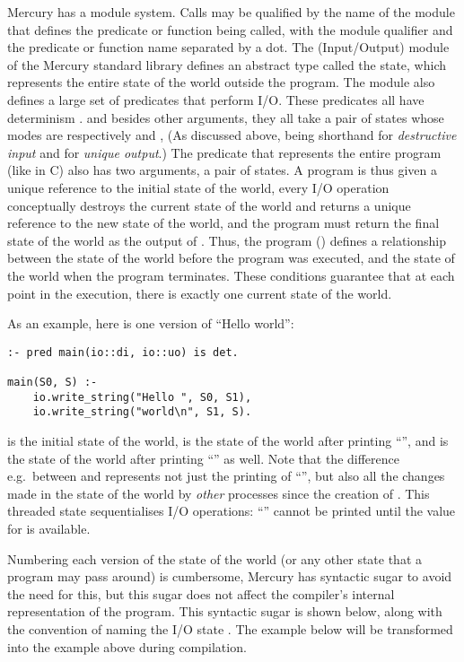 Mercury has a module system.
Calls may be qualified by the name of the module
that defines the predicate or function being called,
with the module qualifier and the predicate or function name
separated by a dot.
The \io (Input/Output) module of the Mercury standard library
defines an abstract type called the \io state,
which represents the entire state of the world outside the program.
The \io module also defines a large set of predicates that perform I/O.
These predicates all have determinism .
and besides other arguments,
they all take a pair of \io states
whose modes are respectively \di and \uo,
(As discussed above, \di being shorthand for \emph{destructive input}
and \uo for \emph{unique output}.)
The  predicate that represents the entire program
(like  in C)
also has two arguments, a  pair of \io states.
A program is thus given
a unique reference to the initial state of the world,
every I/O operation conceptually destroys the current state of the world
and returns a unique reference to the new state of the world,
and the program must return the final state of the world
as the output of .
Thus, the program () defines a relationship between the state
of the world before the program was executed,
and the state of the world when the program terminates.
These conditions guarantee that at each point in the execution,
there is exactly one current state of the world.

As an example, here is one version of ``Hello world'':

\begin{verbatim}
:- pred main(io::di, io::uo) is det.

main(S0, S) :-
    io.write_string("Hello ", S0, S1),
    io.write_string("world\n", S1, S).
\end{verbatim}

\noindent
 is the initial state of the world,
 is the state of the world after printing ``'',
and  is the state of the world
after printing ``'' as well.
Note that the difference e.g.\ between  and 
represents not just the printing of ``'',
but also all the changes made in the state of the world
by \emph{other} processes since the creation of .
This threaded state sequentialises I/O operations:
``'' cannot be printed until the value for 
is available.

Numbering each version of the state of the world
(or any other state that a program may pass around) is cumbersome,
Mercury has syntactic sugar to avoid the need for this,
but this sugar does not affect
the compiler's internal representation of the program.
This syntactic sugar is shown below, along with the convention of naming
the I/O state .
The example below will be transformed into the example above during
compilation.


